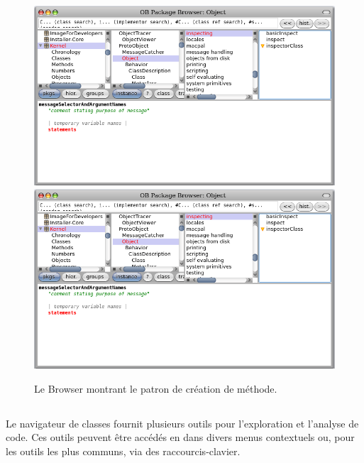 \documentclass[a4paper,10pt,twoside]{book}
\begin{document}
\begin{figure}[htbp]
   \centering
   \ifluluelse
	   {\includegraphics [width=\textwidth]{SystemBrowserMethodTemplate}}
	   {\includegraphics[width=.7\textwidth]{SystemBrowserMethodTemplate}}
   \caption{Le Browser montrant le patron de création de méthode.
   }
\end{figure}

\subsection{} %

Le navigateur de classes fournit plusieurs outils pour l'exploration et 
l'analyse de code. 
Ces outils peuvent être accédés  en \actclickant dans divers menus
contextuels ou, pour les outils les plus communs, via des
raccourcis-clavier.

\subsubsection{}
\end{document}
